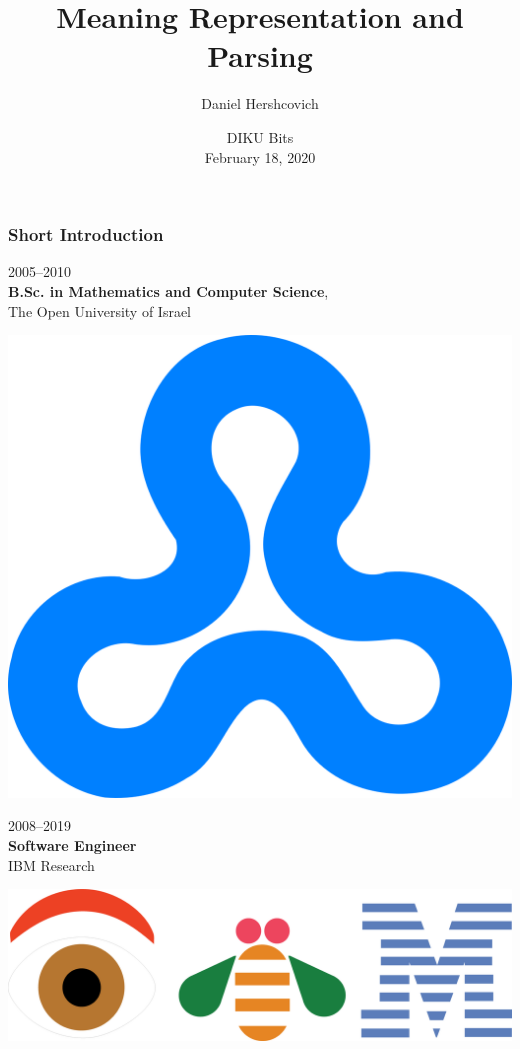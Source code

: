 \documentclass[t,xcolor={svgnames,table}]{beamer}
\begin{document}
\title[]{Meaning Representation and Parsing}
\author{Daniel Hershcovich}
\date{DIKU Bits \\ February 18, 2020}

\begin{frame}
\titlepage
\end{frame}

\begin{frame}
\frametitle{Short Introduction}
\begin{minipage}{.7\textwidth}
2005--2010 \\
\textbf{B.Sc. in Mathematics and Computer Science}, \\
The Open University of Israel
\end{minipage}
\begin{minipage}{.2\textwidth}
\includegraphics[width=\textwidth]{Open_university_israel_logo.png}
\end{minipage}

\vfill\pause

\begin{minipage}{.7\textwidth}
2008--2019 \\
\textbf{Software Engineer} \\
IBM Research
\end{minipage}
\begin{minipage}{.25\textwidth}
\includegraphics[width=\textwidth]{eye_bee_m.png}
\end{minipage}


\end{frame}
\end{document}
